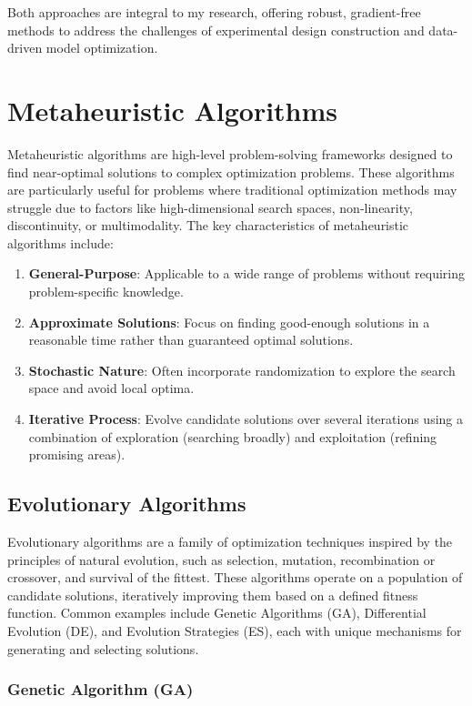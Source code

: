Both approaches are integral to my research, offering robust, gradient-free methods to address the challenges of experimental design construction and data-driven model optimization.

\section{Metaheuristic Algorithms}

Metaheuristic algorithms are high-level problem-solving frameworks designed to find near-optimal solutions to complex optimization problems. These algorithms are particularly useful for problems where traditional optimization methods may struggle due to factors like high-dimensional search spaces, non-linearity, discontinuity, or multimodality. The key characteristics of metaheuristic algorithms include:
\begin{enumerate}
   \item \textbf{General-Purpose}: Applicable to a wide range of problems without requiring problem-specific knowledge.
   \item \textbf{Approximate Solutions}: Focus on finding good-enough solutions in a reasonable time rather than guaranteed optimal solutions.
   \item \textbf{Stochastic Nature}: Often incorporate randomization to explore the search space and avoid local optima.
   \item \textbf{Iterative Process}: Evolve candidate solutions over several iterations using a combination of exploration (searching broadly) and exploitation (refining promising areas).
\end{enumerate}

\subsection{Evolutionary Algorithms}
Evolutionary algorithms are a family of optimization techniques inspired by the principles of natural evolution, such as selection, mutation, recombination or crossover, and survival of the fittest. These algorithms operate on a population of candidate solutions, iteratively improving them based on a defined fitness function. Common examples include Genetic Algorithms (GA), Differential Evolution (DE), and Evolution Strategies (ES), each with unique mechanisms for generating and selecting solutions. 

\subsubsection*{Genetic Algorithm (GA)}

